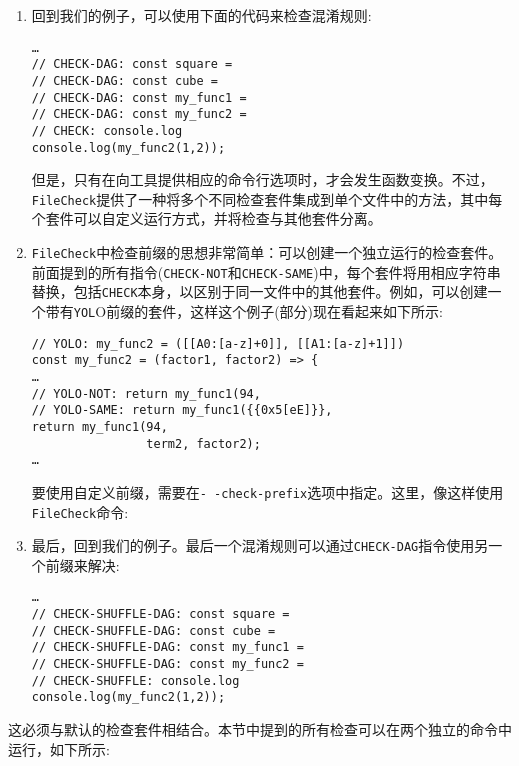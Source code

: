 \begin{enumerate}
\item 回到我们的例子，可以使用下面的代码来检查混淆规则:

\begin{lstlisting}[style=styleJavaScript]
…
// CHECK-DAG: const square =
// CHECK-DAG: const cube =
// CHECK-DAG: const my_func1 =
// CHECK-DAG: const my_func2 =
// CHECK: console.log
console.log(my_func2(1,2));
\end{lstlisting}

但是，只有在向工具提供相应的命令行选项时，才会发生函数变换。不过，\texttt{FileCheck}提供了一种将多个不同检查套件集成到单个文件中的方法，其中每个套件可以自定义运行方式，并将检查与其他套件分离。

\item \texttt{FileCheck}中检查前缀的思想非常简单：可以创建一个独立运行的检查套件。前面提到的所有指令(\texttt{CHECK-NOT}和\texttt{CHECK-SAME})中，每个套件将用相应字符串替换，包括\texttt{CHECK}本身，以区别于同一文件中的其他套件。例如，可以创建一个带有\texttt{YOL}O前缀的套件，这样这个例子(部分)现在看起来如下所示:

\begin{lstlisting}[style=styleJavaScript]
// YOLO: my_func2 = ([[A0:[a-z]+0]], [[A1:[a-z]+1]])
const my_func2 = (factor1, factor2) => {
…
// YOLO-NOT: return my_func1(94,
// YOLO-SAME: return my_func1({{0x5[eE]}},
return my_func1(94,
				term2, factor2);
…
\end{lstlisting}

要使用自定义前缀，需要在\texttt{-\,-check-prefix}选项中指定。这里，像这样使用\texttt{FileCheck}命令:


\item 最后，回到我们的例子。最后一个混淆规则可以通过\texttt{CHECK-DAG}指令使用另一个前缀来解决:

\begin{lstlisting}[style=styleJavaScript]
…
// CHECK-SHUFFLE-DAG: const square =
// CHECK-SHUFFLE-DAG: const cube =
// CHECK-SHUFFLE-DAG: const my_func1 =
// CHECK-SHUFFLE-DAG: const my_func2 =
// CHECK-SHUFFLE: console.log
console.log(my_func2(1,2));
\end{lstlisting}

\end{enumerate}

这必须与默认的检查套件相结合。本节中提到的所有检查可以在两个独立的命令中运行，如下所示:

